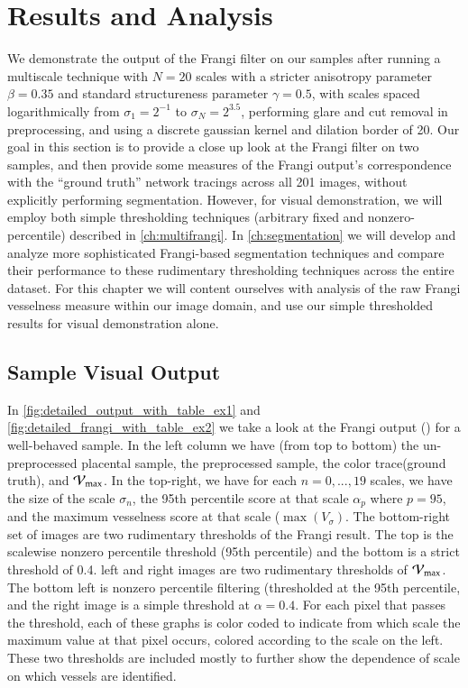 \chapter{Results and Analysis} \label{ch:results-analysis}

We demonstrate the output of the Frangi filter on our samples after running a multiscale technique with $N=20$ scales with a stricter anisotropy parameter $\beta = 0.35$ and standard structureness parameter $\gamma=0.5$,
with scales spaced logarithmically from $\sigma_1 = 2^{-1}$ to $\sigma_N = 2^{3.5}$, performing glare and cut removal in preprocessing, and using a discrete gaussian kernel and dilation border of 20.
Our goal in this section is to provide a close up look at the Frangi filter on two samples, and then provide some measures of the Frangi output's correspondence with the ``ground truth'' network tracings across all 201 images, without explicitly performing segmentation. However, for visual demonstration, we will employ both simple thresholding techniques (arbitrary fixed and nonzero-percentile) described in \cref{ch:multifrangi}. In \cref{ch:segmentation} we will develop and analyze more sophisticated Frangi-based segmentation techniques and compare their performance to these rudimentary thresholding techniques across the entire dataset. For this chapter we will content ourselves with analysis of the raw Frangi vesselness measure within our image domain, and use our simple thresholded results for visual demonstration alone.

\section{Sample Visual Output}
In \cref{fig:detailed_output_with_table_ex1} and \cref{fig:detailed_frangi_with_table_ex2} we take a look at the Frangi output (\Vmax) for a well-behaved sample. In the left column we have (from top to bottom) the un-preprocessed placental sample, the preprocessed sample, the color trace(ground truth), and $\mathcal{V}_{\max}$. In the top-right, we have for each $n=0,...,19$ scales, we have the size of the scale $\sigma_n$, the 95th percentile score at that scale  $\alpha_p$ where $p=95$, and the maximum vesselness score at that scale ($\max(V_\sigma)$. The bottom-right set of images are two rudimentary thresholds of the Frangi result. The top is the scalewise nonzero percentile threshold (95th percentile) and the bottom is a strict threshold of 0.4. left and right images are two rudimentary thresholds of $\mathcal{V}_{\max}$. The bottom left is nonzero percentile filtering (thresholded at the 95th percentile, and the  right image is a simple threshold at $\alpha=0.4$. For each pixel that passes the threshold, each of these graphs is color coded to indicate from which scale the maximum value at that pixel occurs, colored according to the scale on the left. These two thresholds are included mostly to further show the dependence of scale on which vessels are identified.

